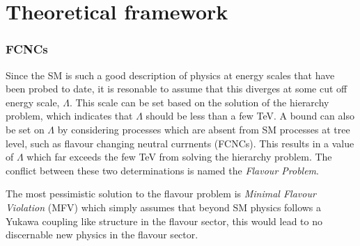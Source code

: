 \chapter{Theoretical framework}
\label{ch:theory}






\subsection{FCNCs}
Since the SM is such a good description of physics at energy scales that have been probed to date,
it is resonable to assume that this diverges at some cut off energy scale, $\Lambda$.
This scale can be set based on the solution of the hierarchy problem, which indicates that
$\Lambda$ should be less than a few TeV.
A bound can also be set on $\Lambda$ by considering processes which are absent from SM processes at
tree level, such as flavour changing neutral currnents (FCNCs).
This results in a value of $\Lambda$ which far exceeds the few TeV from solving the hierarchy
problem.
The conflict between these two determinations is named the \emph{Flavour Problem}.

The most pessimistic solution to the flavour problem is \emph{Minimal Flavour Violation} (MFV)
which simply assumes that beyond SM physics follows a Yukawa coupling like structure in the flavour
sector, this would lead to no discernable new physics in the flavour sector.






%





